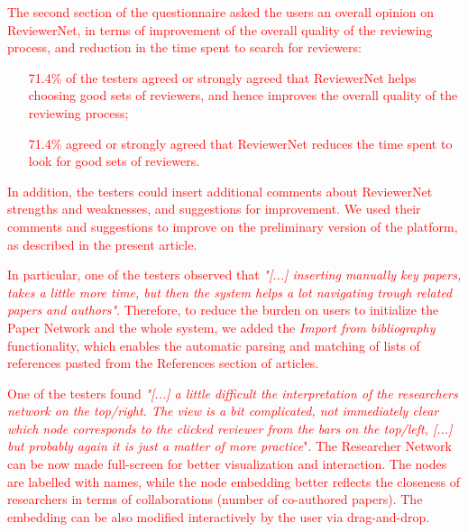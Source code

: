 \textcolor{red}{The second section of the questionnaire asked the users an overall opinion on ReviewerNet, in terms of improvement of the overall quality of the reviewing process, and reduction in the time spent to search for reviewers:  %
%
\begin{itemize}
\item [71.4\%] of the testers agreed or strongly agreed that ReviewerNet helps choosing good sets of reviewers, and hence improves the overall quality of the reviewing process;
\item [71.4\%] agreed or strongly agreed that ReviewerNet reduces the time spent to look for good sets of reviewers. 
\end{itemize}
}

\textcolor{red}{In addition, the testers could insert additional comments about ReviewerNet strengths and weaknesses, and suggestions for improvement. We used their comments and suggestions to improve on the preliminary version of the platform, as described in the present article.}

\textcolor{red}{In particular, one of the testers observed that {\em "[...] inserting manually key papers, takes a little more time, but then the system helps a lot navigating trough related papers and authors"}. Therefore, to reduce the burden on users to initialize the Paper Network and the whole system, we added the \emph{Import from bibliography} functionality, which enables the automatic parsing and matching of lists of references pasted from the References section of articles.}

\textcolor{red}{One of the testers found  {\em "[...] a little difficult the interpretation of the researchers network  on the top/right. The view is a bit complicated, not immediately clear which node corresponds to the clicked reviewer from the bars on the top/left,
[...] but probably again it is just a matter of more practice}". The Researcher Network can be now made full-screen for better visualization and interaction. The nodes are labelled with names, while the node embedding better reflects the closeness of researchers in terms of collaborations (number of co-authored papers). The embedding can be also modified interactively by the user via drag-and-drop.}

